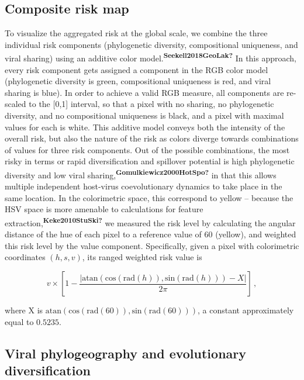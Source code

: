 \documentclass[10pt,oneside]{article}
\begin{document}
\hypertarget{composite-risk-map}{%
\subsection{Composite risk map}\label{composite-risk-map}}

To visualize the aggregated risk at the global scale, we combine the
three individual risk components (phylogenetic diversity, compositional
uniqueness, and viral sharing) using an additive color
model.\textsuperscript{\textbf{Seekell2018GeoLak?}} In this approach,
every risk component gets assigned a component in the RGB color model
(phylogenetic diversity is green, compositional uniqueness is red, and
viral sharing is blue). In order to achieve a valid RGB measure, all
components are re-scaled to the {[}0,1{]} interval, so that a pixel with
no sharing, no phylogenetic diversity, and no compositional uniqueness
is black, and a pixel with maximal values for each is white. This
additive model conveys both the intensity of the overall risk, but also
the nature of the risk as colors diverge towards combinations of values
for three risk components. Out of the possible combinations, the most
risky in terms or rapid diversification and spillover potential is high
phylogenetic diversity and low viral
sharing,\textsuperscript{\textbf{Gomulkiewicz2000HotSpo?}} in that this
allows multiple independent host-virus coevolutionary dynamics to take
place in the same location. In the colorimetric space, this correspond
to yellow -- because the HSV space is more amenable to calculations for
feature extraction,\textsuperscript{\textbf{Keke2010StuSki?}} we
measured the risk level by calculating the angular distance of the hue
of each pixel to a reference value of 60 (yellow), and weighted this
risk level by the value component. Specifically, given a pixel with
colorimetric coordinates \((h,s,v)\), its ranged weighted risk value is

\[
v\times\left[1-\frac{\left|\text{atan}\left(\text{cos}(\text{rad}(h)), \text{sin}(\text{rad}(h))\right) - X\right|}{2\pi}\right]\,,
\]

where X is
\(\text{atan}\left(\text{cos}(\text{rad}(60)), \text{sin}(\text{rad}(60))\right)\),
a constant approximately equal to \(0.5235\).

\hypertarget{viral-phylogeography-and-evolutionary-diversification}{%
\subsection{Viral phylogeography and evolutionary
diversification}\label{viral-phylogeography-and-evolutionary-diversification}}
\end{document}
